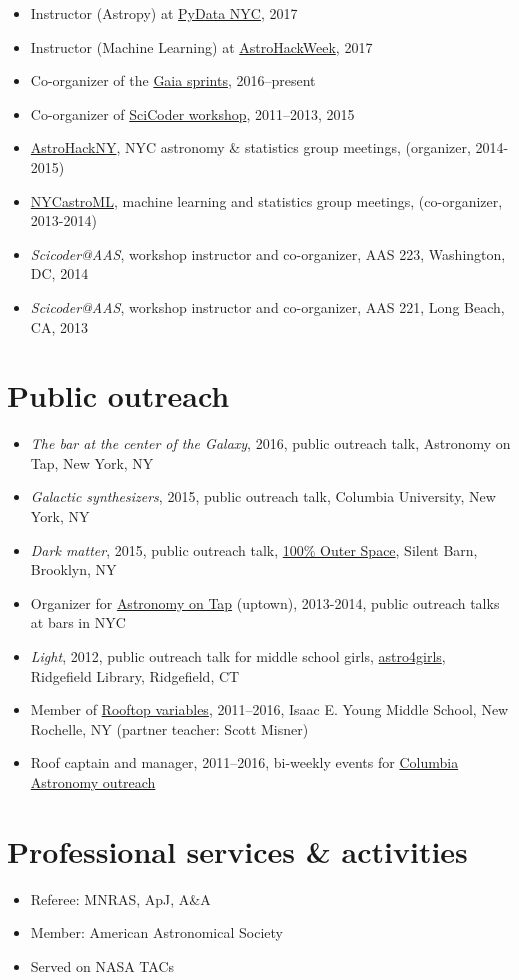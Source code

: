 \documentclass[12pt,letterpaper]{article}
\begin{document}
\begin{itemize}
    \item Instructor (Astropy) at \href{http://pydata.org/nyc2017}{PyData NYC}, 2017
    \item Instructor (Machine Learning) at \href{http://astrohackweek.org}{AstroHackWeek}, 2017
    \item Co-organizer of the \href{http://gaia.lol}{Gaia sprints}, 2016--present
    \item Co-organizer of \href{http://scicoder.org}{SciCoder workshop}, 2011--2013, 2015
    \item \href{https://groups.google.com/forum/#!forum/astrohackny}{AstroHackNY}, NYC astronomy \& statistics group meetings, (organizer, 2014-2015)
    \item \href{https://github.com/adrn/nycastroml}{NYCastroML}, machine learning and statistics group meetings, (co-organizer, 2013-2014)
    \item \emph{Scicoder@AAS}, workshop instructor and co-organizer, AAS 223, Washington, DC, 2014
    \item \emph{Scicoder@AAS}, workshop instructor and co-organizer, AAS 221, Long Beach, CA, 2013
\end{itemize}

\section*{Public outreach}

\begin{itemize}
    \item \emph{The bar at the center of the Galaxy}, 2016, public outreach talk, Astronomy on Tap, New York, NY
    \item \emph{Galactic synthesizers}, 2015, public outreach talk, Columbia University, New York, NY
    \item \emph{Dark matter}, 2015, public outreach talk, \href{http://silentbarn.org/2015/03/100-outer-space-party}{100\% Outer Space}, Silent Barn, Brooklyn, NY
    \item Organizer for \href{http://astronomyontap.org/}{Astronomy on Tap} (uptown), 2013-2014, public outreach talks at bars in NYC
    \item \emph{Light}, 2012, public outreach talk for middle school girls, \href{http://www.newstimes.com/news/article/Astronomer-Shoot-for-the-stars-3380793.php}{astro4girls}, Ridgefield Library, Ridgefield, CT
    \item Member of \href{http://rv.astro.columbia.edu}{Rooftop variables}, 2011--2016, Isaac E. Young Middle School, New Rochelle, NY (partner teacher: Scott Misner)
    \item Roof captain and manager, 2011--2016, bi-weekly events for \href{http://outreach.astro.columbia.edu/}{Columbia Astronomy outreach}
\end{itemize}

\section*{Professional services \& activities}

\begin{itemize}
	\item Referee: MNRAS, ApJ, A\&A
	\item Member: American Astronomical Society
    \item Served on NASA TACs
\end{itemize}
\end{document}
